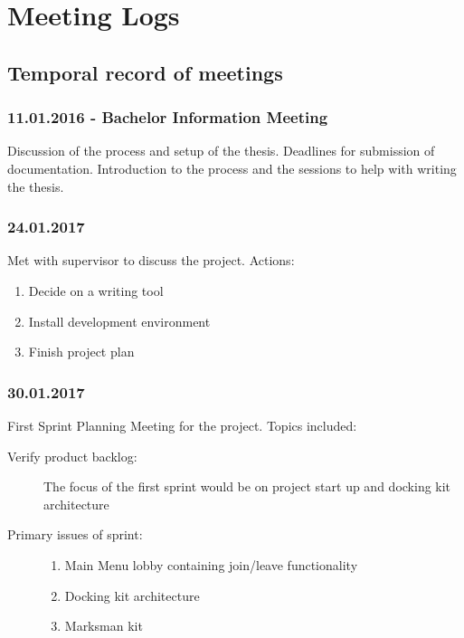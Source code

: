 \chapter{Meeting Logs}
\label{app:meetinglog}
\section{Temporal record of meetings}
\subsection*{11.01.2016 - Bachelor Information Meeting}
Discussion of the process and setup of the thesis.  Deadlines for submission of documentation.  Introduction to the process and the sessions to help with writing the thesis.

\subsection*{24.01.2017}
Met with supervisor to discuss the project. Actions:
\begin{enumerate}
	\item Decide on a writing tool
	\item Install development environment
	\item Finish project plan
\end{enumerate}

\subsection*{30.01.2017}
First Sprint Planning Meeting for the project. Topics included:
\begin{description} 
    \item[Verify product backlog:]  The focus of the first sprint would be on project start up and docking kit architecture 
    \item[Primary issues of sprint: ] \mbox{}
    \begin{enumerate}
        \item Main Menu lobby containing join/leave functionality
        \item Docking kit architecture
        \item Marksman kit
    \end{enumerate}
\end{description}

